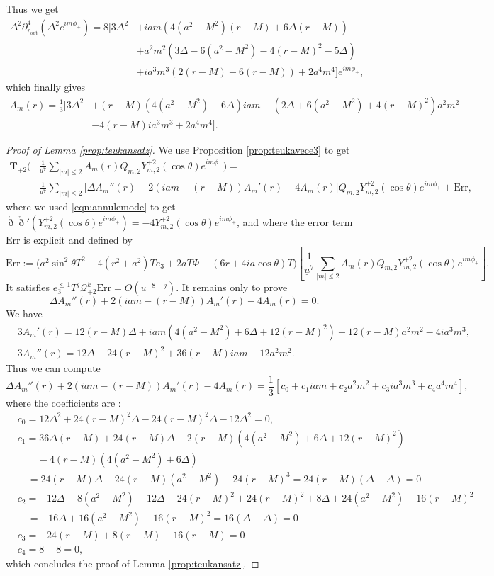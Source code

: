 \documentclass[reqno]{amsart}
\numberwithin{equation}{section}
\newcommand{\mcq}{\mathcal{Q}}
\newcommand{\ubar}{{\underline{u}}}
\newcommand{\carterp}{\mcq_{+2}}
\newcommand{\drond}{\mathring{\eth}}
\newcommand{\teuk}{\mathbf{T}}
\newcommand{\sfrak}{2}
\newcommand{\fraks}{2}
\newcommand{\ansatzp}{\frac{1}{\ubar^{7}}\sum_{|m|\leq2}A_m(r)Q_{m,\sfrak}Y_{m,\sfrak}^{+\sfrak}(\cos\theta)e^{im\phi_{+}}}
\newcommand{\exptruc}{e^{im\phi_{+}}}
\theoremstyle{plain}
\theoremstyle{definition}
\theoremstyle{remark}
\numberwithin{equation}{section}
\begin{document}
Thus we get 
\begin{align*}
    \Delta^2\partial_{r_\mathrm{out}}^4(\Delta^2e^{im\phi_{+}})=8\Bigg[3\Delta^2&+iam(4(a^2-M^2)(r-M)+6\Delta(r-M))\\
    &+a^2m^2(3\Delta-6(a^2-M^2)-4(r-M)^2-5\Delta)\\
    &+ia^3m^3(2(r-M)-6(r-M))+2a^4m^4\Bigg]\exptruc,
\end{align*}
which finally gives
\begin{align}
    \label{eqn:am(r)}A_m(r)=\frac{1}{3}\Big[3\Delta^2&+(r-M)(4(a^2-M^2)+6\Delta)iam-(2\Delta+6(a^2-M^2)+4(r-M)^2)a^2m^2\nonumber\\
    &-4(r-M)ia^3m^3+2a^4m^4\Big].
\end{align}
\begin{proof}[Proof of Lemma \ref{prop:teukansatz}]
We use Proposition \ref{prop:teukavece3} to get 
\begin{align*}
    \teuk_{+2}\Bigg(&\ansatzp\Bigg)=\\
    &\frac{1}{\ubar^7}\sum_{|m|\leq 2}\Big[\Delta A_m''(r)+2(iam-(r-M))A_m'(r)-4 A_m(r)\Big] Q_{m,\fraks}Y_{m,2}^{+2}(\cos\theta)e^{im\phi_{+}}+\mathrm{Err},
\end{align*}
where we used \eqref{eqn:annulemode} to get $\drond\drond'(Y_{m,2}^{+2}(\cos\theta)e^{im\phi_{+}})=-4Y_{m,2}^{+2}(\cos\theta)e^{im\phi_{+}}$, and where the error term $\mathrm{Err}$ is explicit and defined by
$$\mathrm{Err}:=\Big(a^2\sin^2\theta T^2-4(r^2+a^2)Te_3+2aT\Phi-(6r+4ia\cos\theta)T\Big)\left[\ansatzp\right].$$
It satisfies $e_3^{\leq 1}T^j\carterp^k\mathrm{Err}=O(\ubar^{-8-j})$. It remains only to prove
$$\Delta A_m''(r)+2(iam-(r-M))A_m'(r)-4 A_m(r)=0.$$
We have  
\begin{align*}
    &3A_m'(r)=12(r-M)\Delta+iam(4(a^2-M^2)+6\Delta+12(r-M)^2)-12(r-M)a^2m^2-4ia^3m^3,\\
    &3A_m''(r)=12\Delta+24(r-M)^2+36(r-M)iam-12a^2m^2.
\end{align*}
Thus we can compute 
$$\Delta A_m''(r)+2(iam-(r-M))A_m'(r)-4 A_m(r)=\frac{1}{3}[c_0+c_1iam+c_2a^2m^2+c_3ia^3m^3+c_4a^4m^4],$$
where the coefficients are :
\begin{align*}
    &c_0=12\Delta^2+24(r-M)^2\Delta-24(r-M)^2\Delta-12\Delta^2=0,\\
    &c_1=36\Delta(r-M)+24(r-M)\Delta-2(r-M)(4(a^2-M^2)+6\Delta+12(r-M)^2)\\
    &\quad\quad-4(r-M)(4(a^2-M^2)+6\Delta)\\
    &\quad=24(r-M)\Delta-24(r-M)(a^2-M^2)-24(r-M)^3=24(r-M)(\Delta-\Delta)=0\\
    &c_2=-12\Delta-8(a^2-M^2)-12\Delta-24(r-M)^2+24(r-M)^2+8\Delta+24(a^2-M^2)+16(r-M)^2\\
    &\quad=-16\Delta+16(a^2-M^2)+16(r-M)^2=16(\Delta-\Delta)=0\\
    & c_3=-24(r-M)+8(r-M)+16(r-M)=0\\
    & c_4=8-8=0,
\end{align*}
which concludes the proof of Lemma \ref{prop:teukansatz}.
\end{proof}
\end{document}
